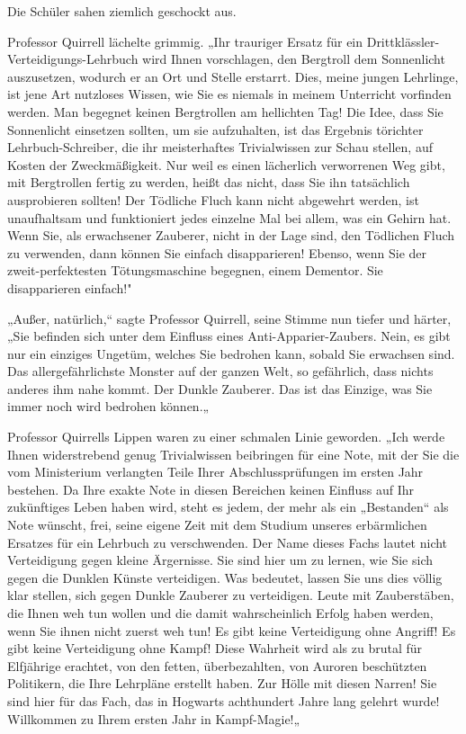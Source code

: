 {Die Schüler sahen ziemlich geschockt aus.

Professor Quirrell lächelte grimmig. „Ihr trauriger Ersatz für ein Drittklässler-Verteidigungs-Lehrbuch wird Ihnen vorschlagen, den Bergtroll dem Sonnenlicht auszusetzen, wodurch er an Ort und Stelle erstarrt. Dies, meine jungen Lehrlinge, ist jene Art nutzloses Wissen, wie Sie es niemals in meinem Unterricht vorfinden werden. Man begegnet keinen Bergtrollen am hellichten Tag! Die Idee, dass Sie Sonnenlicht einsetzen sollten, um sie aufzuhalten, ist das Ergebnis törichter Lehrbuch-Schreiber, die ihr meisterhaftes Trivialwissen zur Schau stellen, auf Kosten der Zweckmäßigkeit. Nur weil es einen lächerlich verworrenen Weg gibt, mit Bergtrollen fertig zu werden, heißt das nicht, dass Sie ihn tatsächlich ausprobieren sollten! Der Tödliche Fluch kann nicht abgewehrt werden, ist unaufhaltsam und funktioniert jedes einzelne Mal bei allem, was ein Gehirn hat. Wenn Sie, als erwachsener Zauberer, nicht in der Lage sind, den Tödlichen Fluch zu verwenden, dann können Sie einfach disapparieren! Ebenso, wenn Sie der zweit-perfektesten Tötungsmaschine begegnen, einem Dementor. Sie disapparieren einfach!"

„Außer, natürlich,“ sagte Professor Quirrell, seine Stimme nun tiefer und härter, „Sie befinden sich unter dem Einfluss eines Anti-Apparier-Zaubers. Nein, es gibt nur ein einziges Ungetüm, welches Sie bedrohen kann, sobald Sie erwachsen sind. Das allergefährlichste Monster auf der ganzen Welt, so gefährlich, dass nichts anderes ihm nahe kommt. Der Dunkle Zauberer. Das ist das Einzige, was Sie immer noch wird bedrohen können.„

Professor Quirrells Lippen waren zu einer schmalen Linie geworden. „Ich werde Ihnen widerstrebend genug Trivialwissen beibringen für eine Note, mit der Sie die vom Ministerium verlangten Teile Ihrer Abschlussprüfungen im ersten Jahr bestehen. Da Ihre exakte Note in diesen Bereichen keinen Einfluss auf Ihr zukünftiges Leben haben wird, steht es jedem, der mehr als ein „Bestanden“ als Note wünscht, frei, seine eigene Zeit mit dem Studium unseres erbärmlichen Ersatzes für ein Lehrbuch zu verschwenden. Der Name dieses Fachs lautet nicht Verteidigung gegen kleine Ärgernisse. Sie sind hier um zu lernen, wie Sie sich gegen die Dunklen Künste verteidigen. Was bedeutet, lassen Sie uns dies völlig klar stellen, sich gegen Dunkle Zauberer zu verteidigen. Leute mit Zauberstäben, die Ihnen weh tun wollen und die damit wahrscheinlich Erfolg haben werden, wenn Sie ihnen nicht zuerst weh tun! Es gibt keine Verteidigung ohne Angriff! Es gibt keine Verteidigung ohne Kampf! Diese Wahrheit wird als zu brutal für Elfjährige erachtet, von den fetten, überbezahlten, von Auroren beschützten Politikern, die Ihre Lehrpläne erstellt haben. Zur Hölle mit diesen Narren! Sie sind hier für das Fach, das in Hogwarts achthundert Jahre lang gelehrt wurde! Willkommen zu Ihrem ersten Jahr in Kampf-Magie!„

}
